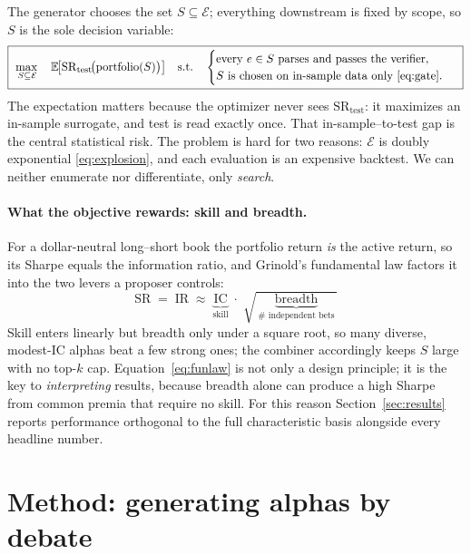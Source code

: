 \documentclass{article}
\theoremstyle{definition}
\theoremstyle{plain}
\theoremstyle{remark}
\newcommand{\E}{\mathbb{E}}
\newcommand{\Expr}{\mathcal{E}}
\newcommand{\Sharpe}{\mathrm{SR}}
\newcommand{\IC}{\mathrm{IC}}
\begin{document}
The generator chooses the set $S\subseteq\Expr$; everything downstream is fixed by
scope, so $S$ is the sole decision variable:
\begin{equation}
\boxed{\
\max_{\,S \subseteq \Expr}\quad
\E\!\big[\Sharpe_{\text{test}}\!\big(\text{portfolio}(S)\big)\big]
\quad\text{s.t.}\quad
\begin{cases}
\text{every } e\in S \text{ parses and passes the verifier},\\
S \text{ is chosen on in-sample data only \eqref{eq:gate}}.
\end{cases}
\ }
\label{eq:outer}
\end{equation}
The expectation matters because the optimizer never sees $\Sharpe_{\text{test}}$: it
maximizes an in-sample surrogate, and test is read exactly once. That
in-sample--to-test gap is the central statistical risk. The problem is hard for two
reasons: $\Expr$ is doubly exponential \eqref{eq:explosion}, and each evaluation is
an expensive backtest. We can neither enumerate nor differentiate, only \emph{search}.

\paragraph{What the objective rewards: skill and breadth.} For a dollar-neutral
long--short book the portfolio return \emph{is} the active return, so its Sharpe equals
the information ratio, and Grinold's fundamental law factors it into the two levers a
proposer controls:
\begin{equation}
\boxed{\ \Sharpe \;=\; \mathrm{IR} \;\approx\; \underbrace{\IC}_{\text{skill}}\;\cdot\;\sqrt{\,\underbrace{\mathrm{breadth}}_{\#\text{ independent bets}}\,}\ }
\label{eq:funlaw}
\end{equation}
Skill enters linearly but breadth only under a square root, so many diverse,
modest-$\IC$ alphas beat a few strong ones; the combiner accordingly keeps $S$ large
with no top-$k$ cap. Equation~\eqref{eq:funlaw} is not only a design principle; it
is the key to \emph{interpreting} results, because breadth alone can produce a high
Sharpe from common premia that require no skill. For this reason
Section~\ref{sec:results} reports performance orthogonal to the full characteristic
basis alongside every headline number.

\section{Method: generating alphas by debate}
\label{sec:method}
\end{document}
